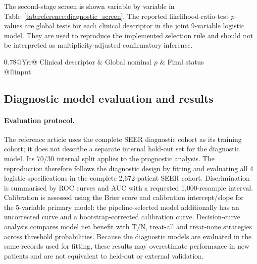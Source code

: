 The second-stage screen is shown variable by variable in
Table~\ref{tab:reference:diagnostic_screen}. The reported likelihood-ratio-test
$p$-values are global tests for each clinical descriptor in the joint
9-variable logistic model. They are used to reproduce the implemented selection
rule and should not be interpreted as multiplicity-adjusted confirmatory inference.

\begin{table}[htbp]
\centering\small
\caption{Diagnostic multivariable screen applied to the 9
$\lambda_{\mathrm{1se}}$ clinical descriptors.}
\label{tab:reference:diagnostic_screen}
\begin{tabularx}{0.78\linewidth}{@{}Yrr@{}}
\toprule
Clinical descriptor & Global nominal $p$ & Final status \\
\midrule
\csname @@input
\bottomrule
\end{tabularx}
\end{table}

\FloatBarrier

\subsection{Diagnostic model evaluation and results}
\label{sec:reference:diagnostic_results}

\paragraph{Evaluation protocol.}
The reference article uses the complete SEER diagnostic cohort as its training
cohort; it does not describe a separate internal hold-out set for the diagnostic
model. Its 70/30 internal split applies to the prognostic analysis. The reproduction
therefore follows the diagnostic design by fitting and evaluating all 4 logistic
specifications in the complete 2,672-patient SEER cohort. Discrimination is
summarised by ROC curves and AUC with a requested 1,000-resample interval.
Calibration is assessed using the Brier score and calibration intercept/slope for
the 5-variable primary model; the pipeline-selected model additionally has an
uncorrected curve and a bootstrap-corrected calibration curve. Decision-curve
analysis compares model net benefit with T/N, treat-all and treat-none strategies
across threshold probabilities. Because the diagnostic models are evaluated in the
same records used for fitting, these results may overestimate performance in new
patients and are not equivalent to held-out or external validation.

